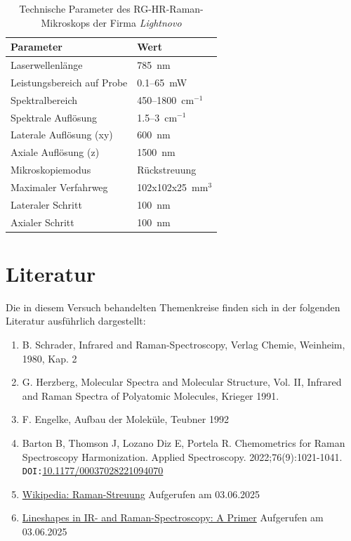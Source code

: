 \begin{table}[H]
    \centering
    \caption{Technische Parameter des RG-HR-Raman-Mikroskops der Firma \textit{Lightnovo}}
    \begin{tabular}{l|l}
        \textbf{Parameter}                & \textbf{Wert}        \\
        \hline
        Laserwellenlänge                  & 785~nm                        \\
        Leistungsbereich auf Probe        & 0.1--65~mW                  \\
        Spektralbereich                   & 450--1800~cm$^{-1}$       \\
        Spektrale Auflösung               & 1.5--3~cm$^{-1}$        \\
        Laterale  Auflösung  (xy)         & 600~nm                        \\
        Axiale Auflösung (z)              & 1500~nm                       \\
        Mikroskopiemodus                  & Rückstreuung            \\
        Maximaler Verfahrweg              & 102x102x25~mm$^3$ \\
        Lateraler Schritt                 & 100~nm                        \\
        Axialer Schritt                   & 100~nm        \\
        \hline                
    \end{tabular}
    \label{tab:785nm-parameter}
\end{table}

\clearpage
\section{Literatur}
Die in diesem Versuch behandelten Themenkreise finden sich in der folgenden Literatur ausführlich dargestellt:
\begin{enumerate}
    \item B. Schrader, Infrared and Raman-Spectroscopy, Verlag Chemie, Weinheim, 1980, Kap. 2
    \item G. Herzberg, Molecular Spectra and Molecular Structure, Vol. II, Infrared and Raman Spectra of Polyatomic Molecules, Krieger 1991.
    \item F. Engelke, Aufbau der Moleküle, Teubner 1992
    \item Barton B, Thomson J, Lozano Diz E, Portela R. Chemometrics for Raman Spectroscopy Harmonization. Applied Spectroscopy. 2022;76(9):1021-1041.\\
    \texttt{DOI:}\href{https://www.doi.org/10.1177/00037028221094070}{10.1177/00037028221094070}
    \item \href{https://de.wikipedia.org/wiki/Raman-Streuung}{Wikipedia: Raman-Streuung} Aufgerufen am 03.06.2025
    \item \href{https://www.spectroscopyonline.com/view/lineshapes-ir-and-raman-spectroscopy-primer}{Lineshapes in IR- and Raman-Spectroscopy: A Primer} Aufgerufen am 03.06.2025
\end{enumerate}